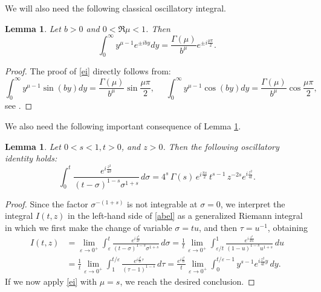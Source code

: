 \documentclass[11pt,letter]{amsart}
\def \G{\Gamma}
\numberwithin{equation}{section}
\newcommand{\ve}{\varepsilon}
\newtheorem{lemma}[theorem]{Lemma}
\numberwithin{equation}{section}
\begin{document}
We will also need the following classical oscillatory integral.

\begin{lemma}\label{L:cis}
Let $b>0$ and $0<\Re \mu<1$. Then
\begin{equation}\label{ei}
\int_0^\infty y^{\mu-1} e^{\pm i by} dy = \frac{\G(\mu)}{b^\mu} e^{\pm i\frac{\mu \pi}{2}}.
\end{equation} 
\end{lemma}

\begin{proof}
The proof of \eqref{ei} directly follows from:
\begin{equation}\label{sincosy}
\int_0^\infty y^{\mu-1} \sin(by) dy = \frac{\G(\mu)}{b^\mu} \sin \frac{\mu \pi}{2},\ \ \ \ \ \ \int_0^\infty y^{\mu-1} \cos(by) dy = \frac{\G(\mu)}{b^\mu} \cos \frac{\mu \pi}{2},
\end{equation}
see \cite[formulas 3.761.4 \& 3.761.9, p.420-1]{GR}.

\end{proof}

We also need the following important consequence of Lemma \ref{L:cis}.

\begin{lemma}\label{L:Abel}
Let $0<s<1, t>0$, and $z>0$. Then the following oscillatory identity holds:
\begin{equation}\label{abel}
\int_0^t
\frac{e^{i \frac{z^2}{4\sigma}}}{(t-\sigma)^{1-s}\sigma^{1+s}}\,d\sigma =
4^s\,\G(s)\,e^{i\frac{\pi s}{2}}\,t^{s-1}\,z^{-2s}
e^{i \frac{z^2}{4t}}.
\end{equation}
\end{lemma}

\begin{proof}
Since the factor $\sigma^{-{(1+s)}}$ is not integrable at $\sigma=0$, we interpret the integral $I(t,z)$ in the left-hand side of \eqref{abel}
as a generalized Riemann integral in which we first make the change of variable $\sigma = t u$, and then $\tau = u^{-1}$, obtaining
\begin{align*}
I(t,z) & = \underset{\ve\to 0^+}{\lim} \int_{\ve}^t \frac{e^{i\frac{z^2}{4\sigma}}}
{(t-\sigma)^{1-s}\sigma^{1+s}}\,d\sigma = \frac{1}{t}\underset{\ve\to 0^+}{\lim}  \int_{\ve/t}^1\frac{e^{i\frac{z^2}{4t u}}}
{(1-u)^{1-s} u^{1+s}}\,du
\\
& = \frac{1}{t} \underset{\ve\to 0^+}{\lim} \int_1^{t/\ve}\frac{e^{i\frac{z^2}{4t }\tau}}
{(\tau-1)^{1-s}}\,d\tau = \frac{e^{i\frac{z^2}{4t }}}{t} \underset{\ve\to 0^+}{\lim} \int_0^{t/\ve -1} y^{s-1}e^{i\frac{z^2}{4t } y}\,dy.
\end{align*}
If we now apply \eqref{ei} with $\mu = s$, we reach the desired conclusion.

\end{proof}
\end{document}

